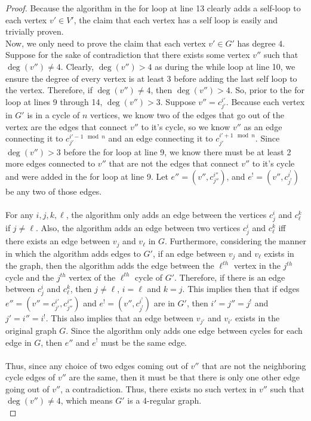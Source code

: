\documentclass[psamsfonts, 10pt]{amsart}
\theoremstyle{definition}
\theoremstyle{remark}
\numberwithin{equation}{section}
\begin{document}
\begin{proof}
Because the algorithm in the for loop at line 13 clearly adds a self-loop to each vertex $v' \in V'$, the claim that each vertex has a self loop is easily and trivially proven.\\

Now, we only need to prove the claim that each vertex $v' \in G'$ has degree $4$. Suppose for the sake of contradiction that there exists some vertex $v''$ such that $\deg(v'') \neq 4$. Clearly, $\deg(v'') > 4$ as during the while loop at line 10, we ensure the degree of every vertex is at least 3 before adding the last self loop to the vertex. Therefore, if $\deg(v'') \neq 4$, then $\deg(v'')
 > 4$. So, prior to the for loop at lines 9 through 14, $\deg(v'') > 3$. Suppose $v'' = c_{j'}^{i'}$. Because each vertex in $G'$ is in a cycle of $n$ vertices, we know two of the edges that go out of the vertex are the edges that connect $v''$ to it's cycle, so we know $v''$ as an edge connecting it to $c_{j'}^{i'-1 \mod n}$ and an edge connecting it to $c_{j'}^{i'+1 \mod n}$. Since $\deg(v'') >3$ before the for loop at line 9, we know there must be at least 2 more edges connected to $v''$ that are not the edges that connect $v''$ to it's cycle and were added in the for loop at line 9. Let $e'' = (v'', c_{j''}^{i''})$, and $e^! = (v'', c_{j^!}^{i^!})$ be any two of those edges.\\
 \\
For any $i, j, k, \ell$, the algorithm only adds an edge between the vertices $c_{j}^i$ and $c_{\ell}^k$ if $j \neq \ell$. Also, the algorithm adds an edge between two vertices $c_{j}^i$ and $c_{\ell}^k$ iff there exists an edge between $v_{j}$ and $v_{\ell}$ in $G$. Furthermore, considering the manner in which the algorithm adds edges to $G'$, if an edge between $v_{j}$ and $v_{\ell}$ exists in the graph, then the algorithm adds the edge between the $\ell^{th}$ vertex in the $j^{th}$ cycle and the $j^{th}$ vertex of the ${\ell}^{th}$ cycle of $G'$. Therefore, if there is an edge between $c_{j}^i$ and $c_{\ell}^k$, then $j \neq \ell$, $i = \ell$ and $k = j$. This implies then that if edges $e'' = (v'' = c_{j'}^{i'}, c_{j''}^{i''})$ and $e^! = (v'', c_{j^!}^{i^!})$ are in $G'$, then $i' = j'' = j^!$ and $j' = i'' = i^!$. This also implies that an edge between $v_{j'}$ and $v_{i'}$ exists in the original graph $G$. Since the algorithm only adds one edge between cycles for each edge in $G$, then $e''$ and $e^!$ must be the same edge.\\
\\
Thus, since any choice of two edges coming out of $v''$ that are not the neighboring cycle edges of $v''$ are the same, then it must be that there is only one other edge going out of $v''$, a contradiction. Thus, there exists no such vertex in $v''$ such that $\deg(v'') \neq 4$, which means $G'$ is a 4-regular graph.
\\
\end{proof}
\end{document}
